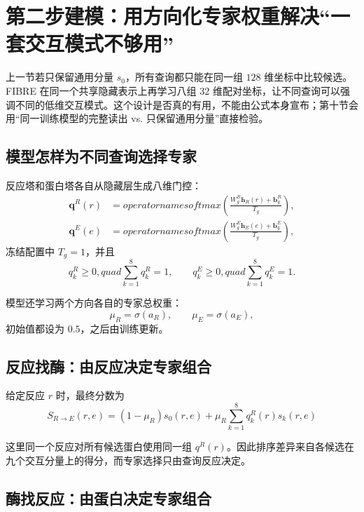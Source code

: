 \documentclass[UTF8,11pt,a4paper]{ctexart}
\begin{document}
\section{第二步建模：用方向化专家权重解决“一套交互模式不够用”}

上一节若只保留通用分量 $s_0$，所有查询都只能在同一组 $128$ 维坐标中比较候选。FIBRE 在同一个共享隐藏表示上再学习八组 $32$ 维配对坐标，让不同查询可以强调不同的低维交互模式。这个设计是否真的有用，不能由公式本身宣布；第十节会用“同一训练模型的完整读出 vs. 只保留通用分量”直接检验。

\subsection{模型怎样为不同查询选择专家}

反应塔和蛋白塔各自从隐藏层生成八维门控：
\begin{align}
\bm q^R(r)
&=operatorname{softmax}
\left(\frac{W_g^R\bm h_R(r)+\bm b_g^R}{T_g}\right),\\
\bm q^E(e)
&=operatorname{softmax}
\left(\frac{W_g^E\bm h_E(e)+\bm b_g^E}{T_g}\right),
\label{eq:gates}
\end{align}
冻结配置中 $T_g=1$，并且
\begin{equation}
q_k^R\ge0,quad \sum_{k=1}^{8}q_k^R=1,
\qquad
q_k^E\ge0,quad \sum_{k=1}^{8}q_k^E=1.
\end{equation}

模型还学习两个方向各自的专家总权重：
\begin{equation}
\mu_R=\sigma(a_R),
\qquad
\mu_E=\sigma(a_E),
\label{eq:mix-mass}
\end{equation}
初始值都设为 $0.5$，之后由训练更新。

\subsection{反应找酶：由反应决定专家组合}

给定反应 $r$ 时，最终分数为
\begin{equation}
\boxed{
S_{R\rightarrow E}(r,e)
=
(1-\mu_R)s_0(r,e)
+
\mu_R\sum_{k=1}^{8}q_k^R(r)s_k(r,e)
}
\label{eq:r2e-score}
\end{equation}

这里同一个反应对所有候选蛋白使用同一组 $q^R(r)$。因此排序差异来自各候选在九个交互分量上的得分，而专家选择只由查询反应决定。

\subsection{酶找反应：由蛋白决定专家组合}
\end{document}
